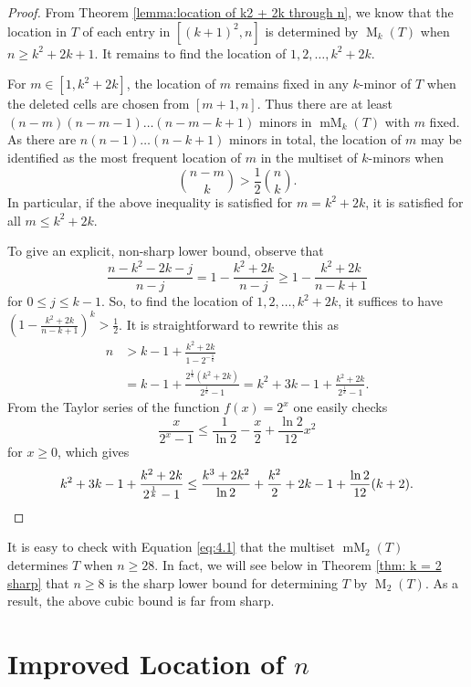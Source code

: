 \documentclass[12pt]{amsart}
\theoremstyle{definition}
\theoremstyle{remark}
\numberwithin{equation}{section}
\numberwithin{figure}{section}
\newcommand{\M}{\operatorname{M}}
\newcommand{\mM}{\operatorname{mM}}
\begin{document}
\begin{proof}
    From Theorem \ref{lemma:location of k2 + 2k through n}, we know that the location in $T$ of each entry in $[(k+1)^2, n]$ is determined by $\M_k(T)$ when $n \geq k^2 + 2k + 1$. It remains to find the location of $1, 2, \ldots, k^2 + 2k$.

    For $m \in [1, k^2 + 2k]$, the location of $m$ remains fixed in any $k$-minor of $T$ when the deleted cells are chosen from $[m + 1, n]$. Thus there are at least $(n - m) (n - m - 1) \ldots (n - m - k + 1)$
    minors in $\mM_k(T)$ with $m$ fixed. As there are $n (n-1) \ldots (n-k+1)$ minors in total, the location of $m$ may be identified as the most frequent location of $m$ in the multiset of $k$-minors when
    \[ \binom{n - m}{k} > \frac{1}{2} \binom{n}{k}. \]
    In particular, if the above inequality is satisfied for $m = k^2 + 2k$, it is satisfied for all $m\le k^2 + 2k$.

    To give an explicit, non-sharp lower bound, observe that
    \[\frac{n-k^2-2k-j}{n-j} = 1-\frac{k^2+2k}{n-j}\geq  1-\frac{k^2+2k}{n-k+1}\]
    for $0\leq j \leq k-1$. So, to find the location of $1, 2, \ldots, k^2 + 2k$, it suffices to have $( 1-\frac{k^2+2k}{n-k+1})^k > \frac{1}{2}$. It is straightforward to rewrite this as
    \begin{align*}
    n & > k-1+\frac{k^2+2k}{1 - 2^{-\frac{1}{k}}}\\ & = k-1 + \frac{2^{\frac{1}{k}}(k^2 + 2k)}{2^{\frac{1}{k}} - 1}= k^2 + 3k - 1+\frac{k^2 + 2k}{2^{\frac{1}{k}} - 1}.
    \end{align*}
    From the Taylor series of the function $f(x)=2^x$ one easily checks
    \[\frac{x}{2^x-1}\le \frac1{\ln 2}-\frac x2 + \frac{\ln 2}{12} x^2\]
    for $x\ge 0$, which gives
    \[k^2 + 3k - 1+\frac{k^2 + 2k}{2^{\frac{1}{k}} - 1}\le \frac{k^3+2k^2}{\ln 2}+\frac {k^2}2 +2k-1 + \frac{\ln 2}{12} (k+2).\qedhere\]
\end{proof}

It is easy to check with Equation \eqref{eq:4.1} that the multiset $\mM_2(T)$ determines $T$ when $n \geq 28$. In fact, we will see below in Theorem \ref{thm: k = 2 sharp} that $n \geq 8$ is the sharp lower bound for determining $T$ by $\M_2(T)$. As a result, the above cubic bound is far from sharp.






\section{Improved Location of $n$}
\end{document}
